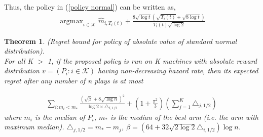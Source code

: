 \documentclass{article}
\DeclareMathOperator*{\argmax}{argmax}
\theoremstyle{plain}
\newtheorem{theo}{Theorem}
\begin{document}
Thus, the policy in (\ref{policy normal}) can be written as,
\begin{align}
    \argmax_{i \in \mathcal{K}} \hat{m}_{i, T_i(t)} + \frac{8 \sqrt{\log t} (\sqrt{ T_i(t)} + \sqrt{8\log t})}{T_i(t)  \sqrt{\log 2}}
\end{align}

\begin{theo}
(Regret bound for policy of absolute value of standard normal distribution). \\

For all K $>$ 1, if the proposed policy is run on K machines with absolute reward distribution $v = (P_i: i \in \mathcal{K})$ having non-decreasing hazard rate, then its expected regret after any number of n plays is at most 

\begin{align}
    \sum_{i: m_i < m_\ast} \frac{(\sqrt{\beta} + 8 \sqrt{\log n})^2}{\log 2 \times \triangle_{i, 1/2}} + (1 + \frac{\pi^2}{3}) (\sum_{j=1}^K \triangle_{j, 1/2}) 
\end{align}
where $m_i$ is the median of $P_i$, $m_\ast$ is the median of the best arm (i.e. the arm with maximum median). $\triangle_{j, 1/2} = m_\ast - m_j$, $\beta = (64 + 32 \sqrt{2 \log 2} \triangle_{i,1/2} )\log n$. 
\end{theo}
\end{document}
